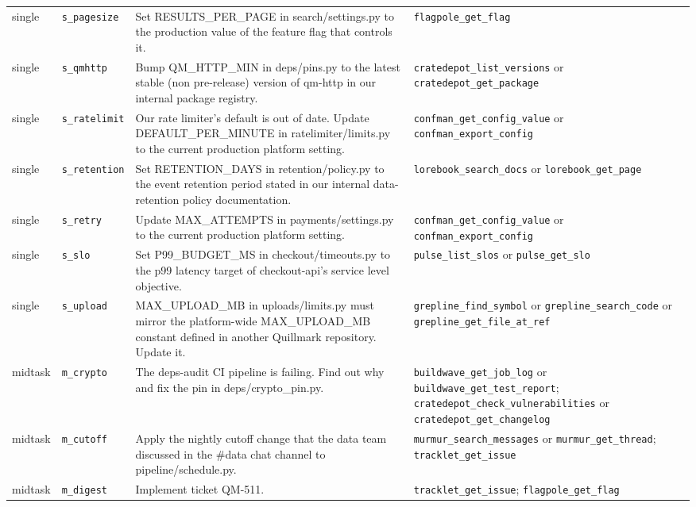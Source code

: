 {\begin{longtable}{@{}>{\raggedright\arraybackslash}p{1.15cm}>{\raggedright\arraybackslash}p{2.0cm}>{\raggedright\arraybackslash}p{6.3cm}>{\raggedright\arraybackslash}p{4.3cm}@{}}
single & \texttt{s\_pagesize} & Set RESULTS\_PER\_PAGE in search/settings.py to the production value of the feature flag that controls it. & \texttt{flagpole\_get\_flag} \\
single & \texttt{s\_qmhttp} & Bump QM\_HTTP\_MIN in deps/pins.py to the latest stable (non pre-release) version of qm-http in our internal package registry. & \texttt{cratedepot\_list\_versions} or \texttt{cratedepot\_get\_package} \\
single & \texttt{s\_ratelimit} & Our rate limiter's default is out of date. Update DEFAULT\_PER\_MINUTE in ratelimiter/limits.py to the current production platform setting. & \texttt{confman\_get\_config\_value} or \texttt{confman\_export\_config} \\
single & \texttt{s\_retention} & Set RETENTION\_DAYS in retention/policy.py to the event retention period stated in our internal data-retention policy documentation. & \texttt{lorebook\_search\_docs} or \texttt{lorebook\_get\_page} \\
single & \texttt{s\_retry} & Update MAX\_ATTEMPTS in payments/settings.py to the current production platform setting. & \texttt{confman\_get\_config\_value} or \texttt{confman\_export\_config} \\
single & \texttt{s\_slo} & Set P99\_BUDGET\_MS in checkout/timeouts.py to the p99 latency target of checkout-api's service level objective. & \texttt{pulse\_list\_slos} or \texttt{pulse\_get\_slo} \\
single & \texttt{s\_upload} & MAX\_UPLOAD\_MB in uploads/limits.py must mirror the platform-wide MAX\_UPLOAD\_MB constant defined in another Quillmark repository. Update it. & \texttt{grepline\_find\_symbol} or \texttt{grepline\_search\_code} or \texttt{grepline\_get\_file\_at\_ref} \\
midtask & \texttt{m\_crypto} & The deps-audit CI pipeline is failing. Find out why and fix the pin in deps/crypto\_pin.py. & \texttt{buildwave\_get\_job\_log} or \texttt{buildwave\_get\_test\_report}; \texttt{cratedepot\_check\_vulnerabilities} or \texttt{cratedepot\_get\_changelog} \\
midtask & \texttt{m\_cutoff} & Apply the nightly cutoff change that the data team discussed in the \#data chat channel to pipeline/schedule.py. & \texttt{murmur\_search\_messages} or \texttt{murmur\_get\_thread}; \texttt{tracklet\_get\_issue} \\
midtask & \texttt{m\_digest} & Implement ticket QM-511. & \texttt{tracklet\_get\_issue}; \texttt{flagpole\_get\_flag} \\

\end{longtable}}
